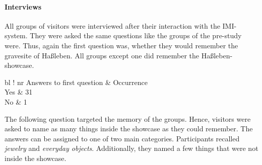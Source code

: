 
\paragraph{Interviews} All groups of visitors were interviewed after their interaction with the \ac{IMI}-system. They were asked the same questions like the groups of the pre-study were. Thus, again the first question was, whether they would remember the gravesite of Haßleben. All groups except one did remember the Haßleben-showcase.
\begin{table}[H]
	\centering
	\begin{tabular}{ bl !{\vrule width 1pt} nr }
		\rowstyle{\bfseries}
		Answers	to first question	& Occurrence 	\\
		\toprule
		Yes												& 31					\\
		No												& 1						\\
	\end{tabular}
	\caption{Answers to the first question of the main study's interview.}
	\label{tab:main_study_question_1}  
\end{table}
The following question targeted the memory of the groups. Hence, visitors were asked to name as many things inside the showcase as they could remember. The answers can be assigned to one of two main categories. Participants recalled \textit{jewelry} and \textit{everyday objects}. Additionally, they named a few things that were not inside the showcase.
